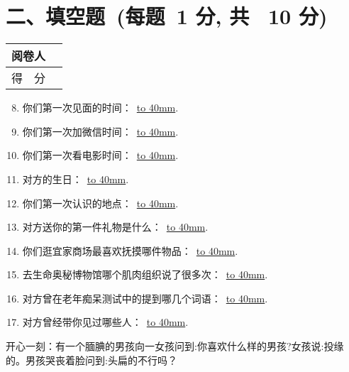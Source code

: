 \documentclass[twocolumn,landscape,UTF8]{ctexart}
\newcommand{\putzdx}{\marginpar{
		\parbox{1cm}{\vspace{-1.6cm}
			\rotatebox[origin=c]{90}{
				\usebox{\zdx}
		}}
}}
\begin{document}
\begin{spacing}{1.3}
\begin{enumerate}
\end{enumerate}

\section*{\hspace{5cm} 二、填空题~(每题~1 分, 共~ 10 分)}
\vspace{-1cm}

\begin{tabular}{|p{}|p{}|}
	\hline
	\centering 阅卷人& \\
	\hline
	\centering 得~~分 &  \\
	\hline
\end{tabular}
\begin{enumerate}\setcounter{enumi}{7}
	
\item 你们第一次见面的时间：~\underline{\hbox to 40mm{}}.
	
\item 你们第一次加微信时间：~\underline{\hbox to 40mm{}}.
	
\item 你们第一次看电影时间：~\underline{\hbox to 40mm{}}.
	
\item 对方的生日：~\underline{\hbox to 40mm{}}.
	
\item 你们第一次认识的地点：~\underline{\hbox to 40mm{}}.
	
\item 对方送你的第一件礼物是什么：~\underline{\hbox to 40mm{}}.
	
\item 你们逛宜家商场最喜欢抚摸哪件物品：~\underline{\hbox to 40mm{}}.
	
\item 去生命奥秘博物馆哪个肌肉组织说了很多次：~\underline{\hbox to 40mm{}}.
	
\item 对方曾在老年痴呆测试中的提到哪几个词语：~\underline{\hbox to 40mm{}}.
	
\item 对方曾经带你见过哪些人：~\underline{\hbox to 40mm{}}.
	

\end{enumerate}

{\color{red}开心一刻：有一个腼腆的男孩向一女孩问到:你喜欢什么样的男孩?女孩说:投缘的。男孩哭丧着脸问到:头扁的不行吗？} 
\newpage
\putzdx %


\end{spacing}
\end{document}
